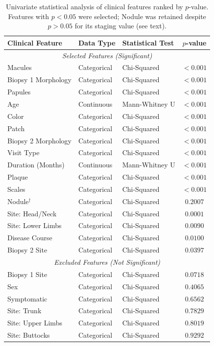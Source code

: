 \documentclass[conference]{IEEEtran}
\begin{document}
\begin{table}[htbp]
    \centering
    \caption{Univariate statistical analysis of clinical features ranked by $p$-value. Features with $p < 0.05$ were selected; Nodule was retained despite $p > 0.05$ for its staging value (see text).}
    \label{tab:clinical_univariate}
    \begin{tabular}{@{}lllc@{}}
        \toprule
        \textbf{Clinical Feature} & \textbf{Data Type} & \textbf{Statistical Test} & \textbf{$p$-value} \\
        \midrule
        \multicolumn{4}{c}{\textit{Selected Features (Significant)}} \\
        \midrule
        Macules & Categorical & Chi-Squared & $<0.001$ \\
        Biopsy 1 Morphology & Categorical & Chi-Squared & $<0.001$ \\
        Papules & Categorical & Chi-Squared & $<0.001$ \\
        Age & Continuous & Mann-Whitney U & $<0.001$ \\
        Color & Categorical & Chi-Squared & $<0.001$ \\
        Patch & Categorical & Chi-Squared & $<0.001$ \\
        Biopsy 2 Morphology & Categorical & Chi-Squared & $<0.001$ \\
        Visit Type & Categorical & Chi-Squared & $<0.001$ \\
        Duration (Months) & Continuous & Mann-Whitney U & $<0.001$ \\
        Plaque & Categorical & Chi-Squared & $<0.001$ \\
        Scales & Categorical & Chi-Squared & $<0.001$ \\
        Nodule$^{\dagger}$ & Categorical & Chi-Squared & $0.2007$ \\
        Site: Head/Neck & Categorical & Chi-Squared & $0.0001$ \\
        Site: Lower Limbs & Categorical & Chi-Squared & $0.0090$ \\
        Disease Course & Categorical & Chi-Squared & $0.0100$ \\
        Biopsy 2 Site & Categorical & Chi-Squared & $0.0397$ \\
        \midrule
        \multicolumn{4}{c}{\textit{Excluded Features (Not Significant)}} \\
        \midrule
        Biopsy 1 Site & Categorical & Chi-Squared & $0.0718$ \\
        Sex & Categorical & Chi-Squared & $0.4065$ \\
        Symptomatic & Categorical & Chi-Squared & $0.6562$ \\
        Site: Trunk & Categorical & Chi-Squared & $0.7829$ \\
        Site: Upper Limbs & Categorical & Chi-Squared & $0.8019$ \\
        Site: Buttocks & Categorical & Chi-Squared & $0.9292$ \\
        \bottomrule
    \end{tabular}
\end{table}
\end{document}

